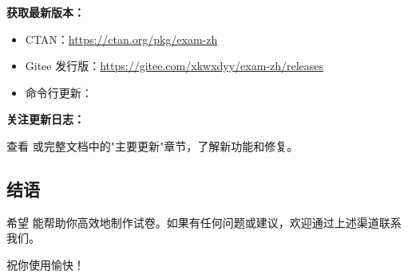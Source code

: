 \textbf{获取最新版本：}

\begin{itemize}
  \item CTAN：\url{https://ctan.org/pkg/exam-zh}
  \item Gitee 发行版：\url{https://gitee.com/xkwxdyy/exam-zh/releases}
  \item 命令行更新：
\end{itemize}

\textbf{关注更新日志：}

查看  或完整文档中的"主要更新"章节，了解新功能和修复。


\subsection{结语}

希望  能帮助你高效地制作试卷。如果有任何问题或建议，欢迎通过上述渠道联系我们。

祝你使用愉快！
